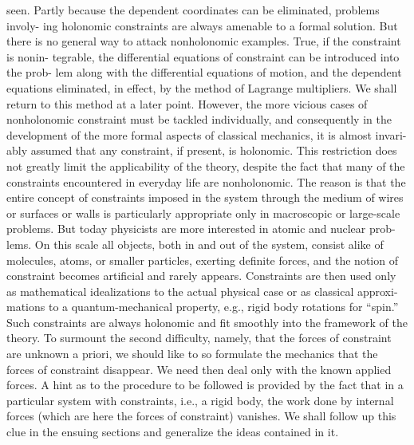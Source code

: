 seen. Partly because the dependent coordinates can be eliminated, problems involy- ing holonomic constraints are always amenable to a formal solution. But there is no general way to attack nonholonomic examples. True, if the constraint is nonin- tegrable, the differential equations of constraint can be introduced into the prob- lem along with the differential equations of motion, and the dependent equations eliminated, in effect, by the method of Lagrange multipliers. We shall return to this method at a later point. However, the more vicious cases of nonholonomic constraint must be tackled individually, and consequently in the development of the more formal aspects of classical mechanics, it is almost invari- ably assumed that any constraint, if present, is holonomic. This restriction does not greatly limit the applicability of the theory, despite the fact that many of the constraints encountered in everyday life are nonholonomic. The reason is that the entire concept of constraints imposed in the system through the medium of wires or surfaces or walls is particularly appropriate only in macroscopic or large-scale problems. But today physicists are more interested in atomic and nuclear prob- lems. On this scale all objects, both in and out of the system, consist alike of molecules, atoms, or smaller particles, exerting definite forces, and the notion of constraint becomes artificial and rarely appears. Constraints are then used only as mathematical idealizations to the actual physical case or as classical approxi- mations to a quantum-mechanical property, e.g., rigid body rotations for “spin.” Such constraints are always holonomic and fit smoothly into the framework of the theory. To surmount the second difficulty, namely, that the forces of constraint are unknown a priori, we should like to so formulate the mechanics that the forces of constraint disappear. We need then deal only with the known applied forces. A hint as to the procedure to be followed is provided by the fact that in a particular system with constraints, i.e., a rigid body, the work done by internal forces (which are here the forces of constraint) vanishes. We shall follow up this clue in the ensuing sections and generalize the ideas contained in it.
